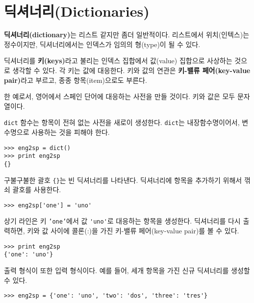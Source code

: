 
\chapter{딕셔너리(Dictionaries)}

{\bf 딕셔너리(dictionary)}는 리스트 같지만 좀더 일반적이다. 리스트에서 위치(인텍스)는 정수이지만, 딕셔너리에서는 인덱스가 임의의 형(type)이 될 수 있다.

딕셔너리를 {\bf 키(keys)}라고 불리는 인덱스 집합에서 값(value) 집합으로 사상하는 것으로 생각할 수 있다. 각 키는 값에 대응한다. 키와 값의 연관은 
{\bf 키-밸류 페어(key-value pair)}라고 부르고, 종종 항목(item)으로도 부른다.

한 예로서, 영어에서 스페인 단어에 대응하는 사전을 만들 것이다. 키와 값은 모두 문자열이다.

{\tt dict} 함수는 항목이 전혀 없는 사전을 새로이 생성한다. {\tt dict}는 내장함수명이어서, 변수명으로 사용하는 것을 피해야 한다.


\beforeverb
\begin{verbatim}
>>> eng2sp = dict()
>>> print eng2sp
{}
\end{verbatim}
\afterverb

구불구불한 괄호 \verb"{}"는 빈 딕셔너리를 나타낸다. 딕셔너리에 항목을 추가하기 위해서 꺾쇠 괄호를 사용한다.


\beforeverb
\begin{verbatim}
>>> eng2sp['one'] = 'uno'
\end{verbatim}
\afterverb
%

상기 라인은 키 {\tt 'one'}에서 값 \verb"'uno'"로 대응하는 항목을 생성한다. 딕셔너리를 다시 출력하면, 
키와 값 사이에 콜론(:)을 가진 키-밸류 페어(key-value pair)를 볼 수 있다.

\beforeverb
\begin{verbatim}
>>> print eng2sp
{'one': 'uno'}
\end{verbatim}
\afterverb
%

출력 형식이 또한 입력 형식이다. 예를 들어, 세개 항목을 가진 신규 딕셔너리를 생성할 수 있다.

\beforeverb
\begin{verbatim}
>>> eng2sp = {'one': 'uno', 'two': 'dos', 'three': 'tres'}
\end{verbatim}
\afterverb
%

